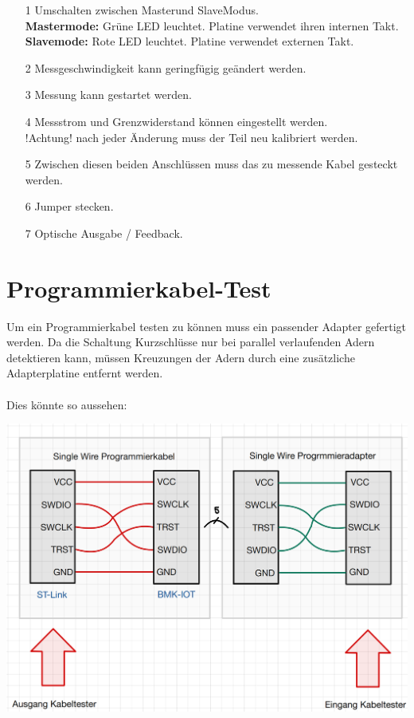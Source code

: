\documentclass[a4paper,11pt]{scrartcl}
\begin{document}
\begin{itemize}
	\item[1] Umschalten zwischen \glqq Master\grqq und \glqq Slave\grqq Modus.\\
				\textbf{Mastermode:} Grüne LED leuchtet. Platine verwendet ihren internen Takt.\\
				\textbf{Slavemode:} Rote LED leuchtet. Platine verwendet externen Takt.
				
	\item[2] Messgeschwindigkeit kann geringfügig geändert werden.
	
	\item[3] Messung kann gestartet werden.
	
	\item[4] Messstrom und Grenzwiderstand können eingestellt werden.\\
	 			!Achtung! nach jeder Änderung muss der Teil neu kalibriert werden.
	 			
	\item[5] Zwischen diesen beiden Anschlüssen muss das zu messende Kabel gesteckt werden.
	
	\item[6] Jumper stecken.
	
	\item[7] Optische Ausgabe / Feedback.
\end{itemize}

\newpage

\section{Programmierkabel-Test}

Um ein Programmierkabel testen zu können muss ein passender Adapter gefertigt werden. Da die Schaltung Kurzschlüsse nur bei parallel verlaufenden Adern detektieren kann, müssen Kreuzungen der Adern durch eine zusätzliche Adapterplatine entfernt werden. 
\\
\\
Dies könnte so aussehen:

\vspace{1cm}

\begin{center}
\includegraphics[width=15cm]{Bilder/Adapter.png}
\end{center}
\end{document}
